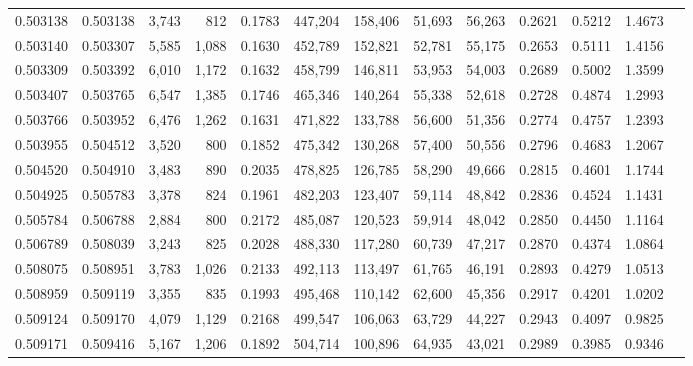 \begin{tabular}{rrrrrrrrrrrrr}
0.503138 & 0.503138 &  3,743 &   812 &                                     0.1783 & 447,204 & 158,406 &  51,693 &  56,263 & 0.2621 & 0.5212 & 1.4673 \\
0.503140 & 0.503307 &  5,585 & 1,088 &                                     0.1630 & 452,789 & 152,821 &  52,781 &  55,175 & 0.2653 & 0.5111 & 1.4156 \\
0.503309 & 0.503392 &  6,010 & 1,172 &                                     0.1632 & 458,799 & 146,811 &  53,953 &  54,003 & 0.2689 & 0.5002 & 1.3599 \\
0.503407 & 0.503765 &  6,547 & 1,385 &                                     0.1746 & 465,346 & 140,264 &  55,338 &  52,618 & 0.2728 & 0.4874 & 1.2993 \\
0.503766 & 0.503952 &  6,476 & 1,262 &                                     0.1631 & 471,822 & 133,788 &  56,600 &  51,356 & 0.2774 & 0.4757 & 1.2393 \\
0.503955 & 0.504512 &  3,520 &   800 &                                     0.1852 & 475,342 & 130,268 &  57,400 &  50,556 & 0.2796 & 0.4683 & 1.2067 \\
0.504520 & 0.504910 &  3,483 &   890 &                                     0.2035 & 478,825 & 126,785 &  58,290 &  49,666 & 0.2815 & 0.4601 & 1.1744 \\
0.504925 & 0.505783 &  3,378 &   824 &                                     0.1961 & 482,203 & 123,407 &  59,114 &  48,842 & 0.2836 & 0.4524 & 1.1431 \\
0.505784 & 0.506788 &  2,884 &   800 &                                     0.2172 & 485,087 & 120,523 &  59,914 &  48,042 & 0.2850 & 0.4450 & 1.1164 \\
0.506789 & 0.508039 &  3,243 &   825 &                                     0.2028 & 488,330 & 117,280 &  60,739 &  47,217 & 0.2870 & 0.4374 & 1.0864 \\
0.508075 & 0.508951 &  3,783 & 1,026 &                                     0.2133 & 492,113 & 113,497 &  61,765 &  46,191 & 0.2893 & 0.4279 & 1.0513 \\
0.508959 & 0.509119 &  3,355 &   835 &                                     0.1993 & 495,468 & 110,142 &  62,600 &  45,356 & 0.2917 & 0.4201 & 1.0202 \\
0.509124 & 0.509170 &  4,079 & 1,129 &                                     0.2168 & 499,547 & 106,063 &  63,729 &  44,227 & 0.2943 & 0.4097 & 0.9825 \\
0.509171 & 0.509416 &  5,167 & 1,206 &                                     0.1892 & 504,714 & 100,896 &  64,935 &  43,021 & 0.2989 & 0.3985 & 0.9346 \\

\end{tabular}
